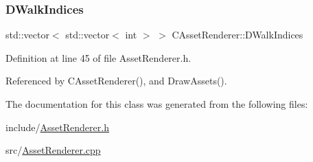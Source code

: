 \subsubsection{\texorpdfstring{D\+Walk\+Indices}{DWalkIndices}}
{\footnotesize\ttfamily std\+::vector$<$ std\+::vector$<$ int $>$ $>$ C\+Asset\+Renderer\+::\+D\+Walk\+Indices\hspace{0.3cm}{\ttfamily [protected]}}



Definition at line 45 of file Asset\+Renderer.\+h.



Referenced by C\+Asset\+Renderer(), and Draw\+Assets().



The documentation for this class was generated from the following files\+:\begin{DoxyCompactItemize}
\item 
include/\hyperlink{AssetRenderer_8h}{Asset\+Renderer.\+h}\item 
src/\hyperlink{AssetRenderer_8cpp}{Asset\+Renderer.\+cpp}\end{DoxyCompactItemize}
